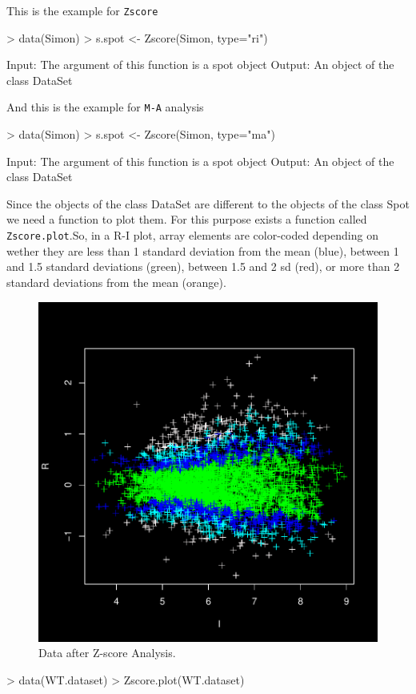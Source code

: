 \documentclass[12pt]{article}
\begin{document}
This is the example for \texttt{Zscore}

\begin{Scode}
> data(Simon)
> s.spot <- Zscore(Simon, type="ri")
\end{Scode}

\begin{Soutput}
Input: The argument of this function is a spot object
Output: An object of the class DataSet
\end{Soutput}

And this is the example for \texttt{M-A} analysis

\begin{Scode}
> data(Simon)
> s.spot <- Zscore(Simon, type="ma")
\end{Scode}

\begin{Soutput}
Input: The argument of this function is a spot object
Output: An object of the class DataSet
\end{Soutput}

Since the objects of the class DataSet are different to the objects of the class Spot we need a function to plot them. For this purpose exists a function called \texttt{Zscore.plot}.So, in a R-I plot, array elements are color-coded depending on wether they are less than 1 standard deviation from the mean (blue), between 1 and 1.5 standard deviations (green), between 1.5 and 2 sd (red), or more than 2 standard deviations from the mean (orange).
\begin{figure}[h]
\begin{center}
\includegraphics{example-genArise-016}
\caption{Data after Z-score Analysis. \label{fig12}}
\end{center}
\end{figure}
\begin{Scode}
> data(WT.dataset)
> Zscore.plot(WT.dataset)
\end{Scode}
\end{document}
